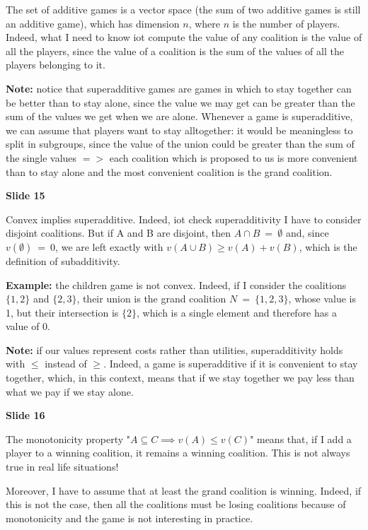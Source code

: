\documentclass[pt11,a4paper,twoside,reqno,openright]{paper}
\begin{document}
\noindent The set of additive games is a vector space (the sum of two 
additive games is still an additive game), which has dimension $n$, where $n$ 
is the number of players. Indeed, what I need to know iot compute the value of 
any coalition is the value of all the players, since the value of a coalition 
is the sum of the values of all the players belonging to it.

\noindent \textbf{Note:} notice that superadditive games are games in which 
to stay together can be better than to stay alone, since the value we may 
get can be greater than the sum of the values we get when we are alone. 
Whenever a game is superadditive, we can assume that players want to stay 
alltogether: it would be meaningless to split in subgroups, since the 
value of the union could be greater than the sum of the single values $=>$ 
each coalition which is proposed to us is more convenient than to stay alone 
and the most convenient coalition is the grand coalition.

\bigskip
\noindent \textbf{Slide 15}

\noindent Convex implies superadditive. Indeed, iot check superadditivity I 
have to consider disjoint coalitions. But if A and B are disjoint, then 
$A \cap B~=~\emptyset$ and, since $v(\emptyset)~=~0$, we are left exactly 
with $v(A\cup B) \geq v(A)+v(B)$, which is the definition of subadditivity.

\noindent \textbf{Example:} the children game is not convex. Indeed, if I 
consider the coalitions $\{1,2\}$ and $\{2,3\}$, their union is the grand 
coalition $N~=~\{1,2,3\}$, whose value is 1, but their intersection is $\{2\}$, 
which is a single element and therefore has a value of 0.

\noindent \textbf{Note:} if our values represent costs rather than utilities, 
superadditivity holds with $\leq$ instead of $\geq$. Indeed, a game is 
superadditive if it is convenient to stay together, which, in this context, 
means that if we stay together we pay less than what we pay if we stay alone.

\bigskip
\noindent \textbf{Slide 16}

\noindent The monotonicity property "$A \subseteq C \implies v(A) \leq v(C)$" 
means that, if I add a player to a winning coalition, it remains a winning 
coalition. This is not always true in real life situations!

\noindent Moreover, I have to assume that at least the grand coalition is 
winning. Indeed, if this is not the case, then all the coalitions must be
losing coalitions because of monotonicity and the game is not interesting 
in practice.
\end{document}
